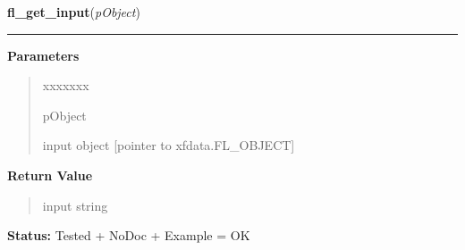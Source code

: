\hspace{.8\funcindent}\begin{boxedminipage}{\funcwidth}

    \raggedright \textbf{fl\_get\_input}(\textit{pObject})

    \vspace{-1.5ex}

    \rule{\textwidth}{0.5\fboxrule}
\setlength{\parskip}{2ex}
\setlength{\parskip}{1ex}
      \textbf{Parameters}
      \vspace{-1ex}

      \begin{quote}
        \begin{Ventry}{xxxxxxx}

          \item[pObject]

          input object [pointer to xfdata.FL\_OBJECT]

        \end{Ventry}

      \end{quote}

      \textbf{Return Value}
    \vspace{-1ex}

      \begin{quote}
      input string

      \end{quote}

\textbf{Status:} Tested + NoDoc + Example = OK



    \end{boxedminipage}

    \label{xformslib:library:fl_set_input_filter}

    \vspace{0.5ex}

